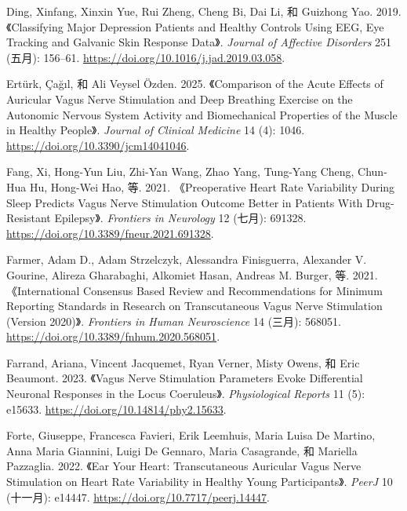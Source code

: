 \documentclass[
  Letterpaper,
]{scrbook}
\newlength{\cslhangindent}
\newenvironment{CSLReferences}[2] %
 {\begin{list}{}{%
  \setlength{\itemindent}{0pt}
  \setlength{\leftmargin}{0pt}
  \setlength{\parsep}{0pt}
  \ifodd #1
   \setlength{\leftmargin}{\cslhangindent}
   \setlength{\itemindent}{-1\cslhangindent}
  \fi
  \setlength{\itemsep}{#2\baselineskip}}}
 {\end{list}}
\begin{document}
\begin{CSLReferences}{1}{0}
Ding, Xinfang, Xinxin Yue, Rui Zheng, Cheng Bi, Dai Li, 和 Guizhong Yao.
2019. {《Classifying Major Depression Patients and Healthy Controls
Using {EEG}, Eye Tracking and Galvanic Skin Response Data》}.
\emph{Journal of Affective Disorders} 251 (五月): 156--61.
\url{https://doi.org/10.1016/j.jad.2019.03.058}.

Ertürk, Çağıl, 和 Ali Veysel Özden. 2025. {《Comparison of the {Acute
Effects} of {Auricular Vagus Nerve Stimulation} and {Deep Breathing
Exercise} on the {Autonomic Nervous System Activity} and {Biomechanical
Properties} of the {Muscle} in {Healthy People}》}. \emph{Journal of
Clinical Medicine} 14 (4): 1046.
\url{https://doi.org/10.3390/jcm14041046}.

Fang, Xi, Hong-Yun Liu, Zhi-Yan Wang, Zhao Yang, Tung-Yang Cheng,
Chun-Hua Hu, Hong-Wei Hao, 等. 2021. {《Preoperative {Heart Rate
Variability During Sleep Predicts Vagus Nerve Stimulation Outcome
Better} in {Patients With Drug-Resistant Epilepsy}》}. \emph{Frontiers
in Neurology} 12 (七月): 691328.
\url{https://doi.org/10.3389/fneur.2021.691328}.

Farmer, Adam D., Adam Strzelczyk, Alessandra Finisguerra, Alexander V.
Gourine, Alireza Gharabaghi, Alkomiet Hasan, Andreas M. Burger, 等.
2021. {《International {Consensus Based Review} and {Recommendations}
for {Minimum Reporting Standards} in {Research} on {Transcutaneous Vagus
Nerve Stimulation} ({Version} 2020)》}. \emph{Frontiers in Human
Neuroscience} 14 (三月): 568051.
\url{https://doi.org/10.3389/fnhum.2020.568051}.

Farrand, Ariana, Vincent Jacquemet, Ryan Verner, Misty Owens, 和 Eric
Beaumont. 2023. {《Vagus Nerve Stimulation Parameters Evoke Differential
Neuronal Responses in the Locus Coeruleus》}. \emph{Physiological
Reports} 11 (5): e15633. \url{https://doi.org/10.14814/phy2.15633}.

Forte, Giuseppe, Francesca Favieri, Erik Leemhuis, Maria Luisa De
Martino, Anna Maria Giannini, Luigi De Gennaro, Maria Casagrande, 和
Mariella Pazzaglia. 2022. {《Ear Your Heart: Transcutaneous Auricular
Vagus Nerve Stimulation on Heart Rate Variability in Healthy Young
Participants》}. \emph{PeerJ} 10 (十一月): e14447.
\url{https://doi.org/10.7717/peerj.14447}.


\end{CSLReferences}
\end{document}
